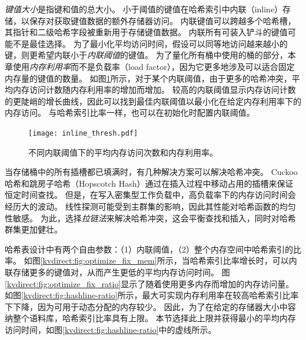 \textit {键值大小}是指键和值的总大小。
小于阈值的键值在哈希索引中内联（inline）存储，以保存对获取键值数据的额外存储器访问。
内联键值可以跨越多个哈希槽，其指针和二级哈希字段被重新用于存储键值数据。
内联所有可装入铲斗的键值可能不是最佳选择。
为了最小化平均访问时间，假设可以同等地访问越来越小的键，则更希望内联小于\textit {内联阈值}的键值。
为了量化所有桶中使用的桶的部分，本章使用\textit {内存利用率}而不是负载率（load factor），因为它更多地涉及可以适合固定内存量的键值的数量。
如图\ref {kvdirect:fig:inline-offline}所示，对于某个内联阈值，由于更多的哈希冲突，平均内存访问计数随内存利用率的增加而增加。
较高的内联阈值显示内存访问计数的更陡峭的增长曲线，因此可以找到最佳内联阈值以最小化在给定内存利用率下的内存访问。
与哈希索引比率一样，也可以在初始化时配置内联阈值。


\begin{figure}[htbp]
	\centering
	\texttt{[image: inline\_thresh.pdf]}
	\caption{不同内联阈值下的平均内存访问次数和内存利用率。}
	\label{kvdirect:fig:inline-offline}
\end{figure}


当存储桶中的所有插槽都已填满时，有几种解决方案可以解决哈希冲突。
Cuckoo哈希\cite {pagh2004cuckoo}和跳房子哈希（Hopscotch Hash）\cite {herlihy2008hopscotch}通过在插入过程中移动占用的插槽来保证恒定时间查找。
但是，在写入密集型工作负载中，高负载率下的内存访问时间会经历大的波动。
线性探测可能受到主群集的影响，因此其性能对哈希函数的均匀性敏感。
为此，选择\textit {拉链法}来解决哈希冲突，这会平衡查找和插入，同时对哈希群集更加健壮。


\label{kvdirect:sec:hashtable-eval}

哈希表设计中有两个自由参数：（1）内联阈值，（2）整个内存空间中哈希索引的比率。
如图\ref {kvdirect:fig:optimize_fix_mem}所示，当哈希索引比率增长时，可以内联存储更多的键值对，从而产生更低的平均内存访问时间。
图\ref {kvdirect:fig:optimize_fix_ratio}显示了随着使用更多内存而增加的内存访问量。
如图\ref {kvdirect:fig:hashline-ratio}所示，最大可实现内存利用率在较高哈希索引比率下下降，因为可用于动态分配的内存较少。
因此，为了在给定的存储器大小中容纳整个语料库，哈希索引比率具有上限。
本节选择此上限并获得最小的平均内存访问时间，如图\ref {kvdirect:fig:hashline-ratio}中的虚线所示。


